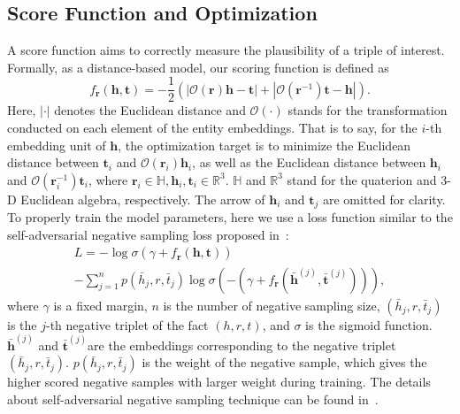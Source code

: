 \documentclass[11pt]{article}
\begin{document}
\subsection{Score Function and Optimization}
A score function aims to correctly measure the plausibility of a triple of interest. Formally, as a distance-based model, our scoring function is defined as 
\begin{equation}
f_{\textbf{r}}(\textbf{h}, \textbf{t}) = -\frac{1}{2}(|\mathcal{O}(\textbf{r})\textbf{h} - \textbf{t}| + |\mathcal{O}(\textbf{r}^{-1})\textbf{t} - \textbf{h}|). 
\end{equation}
\noindent Here, \(|\cdot|\) denotes the Euclidean distance and \(\mathcal{O}({\cdot})\) stands for the transformation conducted on each element of the entity embeddings. That is to say, for the \(i\)-th embedding unit of \(\textbf{h}\), the optimization target is to minimize the Euclidean distance between \(\boldsymbol{t}_i\) and \(\mathcal{O}(\textbf{r}_{i})\boldsymbol{h}_i\), as well as the Euclidean distance between \(\boldsymbol{h}_i\) and \(\mathcal{O}(\textbf{r}_i^{-1})\boldsymbol{t}_i\),
\noindent where \(\textbf{r}_i \in \mathbb{H}, \boldsymbol{h}_i, \boldsymbol{t}_i \in \mathbb{R}^{3}.\) \(\mathbb{H}\) and \(\mathbb{R}^{3}\) stand for the quaterion and 3-D Euclidean algebra, respectively. The arrow of \(\boldsymbol{h}_{i}\) and \(\boldsymbol{t}_{j}\) are omitted for clarity.
To properly train the model parameters, here we use a loss function similar to the self-adversarial negative
sampling loss proposed in~\cite{sun2019rotate}:
\begin{equation}
\begin{split}
L = -\log{\sigma(\gamma + f_{\textbf{r}}(\textbf{h}, \textbf{t}))} \\ - \sum_{j=1}^{n}{p(\bar{h}_j, r, \bar{t}_{j})\log{\sigma(-(\gamma + f_{\textbf{r}}(\bar{\textbf{h}}^{(j)},\bar{\textbf{t}}^{(j)})))}},
\label{loss}
\end{split}
\end{equation}
where \(\gamma\) is a fixed margin, \(n\) is the number of negative sampling size,  \((\bar{h}_j, r, \bar{t}_{j})\) is the \(j\)-th negative triplet of the fact \((h, r, t)\), and \(\sigma\) is the sigmoid function. 
\(\bar{\textbf{h}}^{(j)}\) and \(\bar{\textbf{t}}^{(j)}\)are the embeddings corresponding to the negative triplet \((\bar{h}_j, r, \bar{t}_{j})\).
\(p(\bar{h}_j, r, \bar{t}_{j})\) is the weight of the negative sample, which gives the higher scored negative samples with larger weight during training. The details about self-adversarial negative sampling technique can be found in~\cite{sun2019rotate}.
\end{document}

